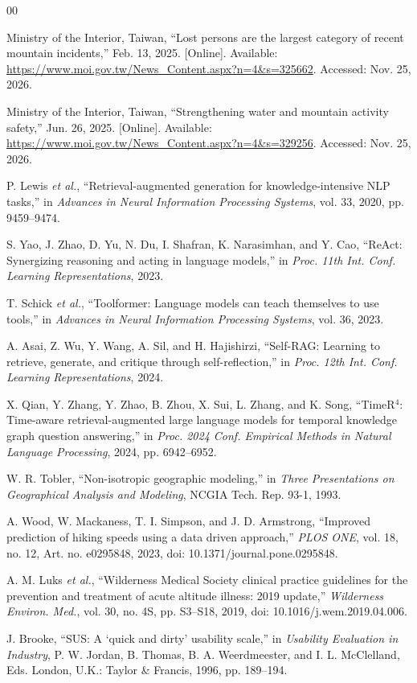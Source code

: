 \documentclass[conference]{IEEEtran}
\begin{document}
\begin{thebibliography}{00}

Ministry of the Interior, Taiwan, ``Lost persons are the largest category of
recent mountain incidents,'' Feb. 13, 2025. [Online]. Available:
\url{https://www.moi.gov.tw/News_Content.aspx?n=4&s=325662}. Accessed:
Nov. 25, 2026.

Ministry of the Interior, Taiwan, ``Strengthening water and mountain activity
safety,'' Jun. 26, 2025. [Online]. Available:
\url{https://www.moi.gov.tw/News_Content.aspx?n=4&s=329256}. Accessed:
Nov. 25, 2026.

P. Lewis \emph{et al.}, ``Retrieval-augmented generation for
knowledge-intensive NLP tasks,'' in \emph{Advances in Neural Information
Processing Systems}, vol. 33, 2020, pp. 9459--9474.

S. Yao, J. Zhao, D. Yu, N. Du, I. Shafran, K. Narasimhan, and Y. Cao,
``ReAct: Synergizing reasoning and acting in language models,'' in
\emph{Proc. 11th Int. Conf. Learning Representations}, 2023.

T. Schick \emph{et al.}, ``Toolformer: Language models can teach themselves
to use tools,'' in \emph{Advances in Neural Information Processing Systems},
vol. 36, 2023.

A. Asai, Z. Wu, Y. Wang, A. Sil, and H. Hajishirzi, ``Self-RAG: Learning to
retrieve, generate, and critique through self-reflection,'' in
\emph{Proc. 12th Int. Conf. Learning Representations}, 2024.

X. Qian, Y. Zhang, Y. Zhao, B. Zhou, X. Sui, L. Zhang, and K. Song,
``TimeR$^4$: Time-aware retrieval-augmented large language models for
temporal knowledge graph question answering,'' in \emph{Proc. 2024 Conf.
Empirical Methods in Natural Language Processing}, 2024, pp. 6942--6952.

W. R. Tobler, ``Non-isotropic geographic modeling,'' in \emph{Three
Presentations on Geographical Analysis and Modeling}, NCGIA Tech. Rep. 93-1,
1993.

A. Wood, W. Mackaness, T. I. Simpson, and J. D. Armstrong, ``Improved
prediction of hiking speeds using a data driven approach,'' \emph{PLOS ONE},
vol. 18, no. 12, Art. no. e0295848, 2023,
doi: 10.1371/journal.pone.0295848.

A. M. Luks \emph{et al.}, ``Wilderness Medical Society clinical practice
guidelines for the prevention and treatment of acute altitude illness: 2019
update,'' \emph{Wilderness Environ. Med.}, vol. 30, no. 4S, pp. S3--S18,
2019, doi: 10.1016/j.wem.2019.04.006.

J. Brooke, ``SUS: A `quick and dirty' usability scale,'' in
\emph{Usability Evaluation in Industry}, P. W. Jordan, B. Thomas,
B. A. Weerdmeester, and I. L. McClelland, Eds. London, U.K.: Taylor \&
Francis, 1996, pp. 189--194.

\end{thebibliography}
\end{document}
